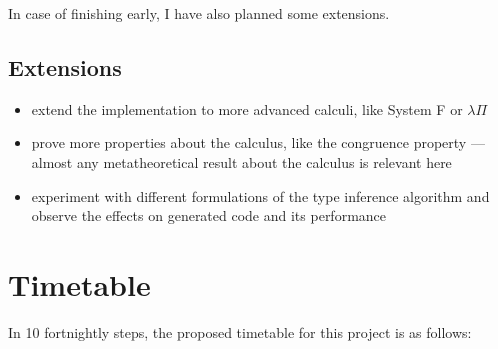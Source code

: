 \documentclass[12pt]{article}
\begin{document}
In case of finishing early, I have also planned some extensions.
\subsection*{Extensions}
\begin{itemize}
\item
extend the implementation to more advanced calculi, like System F or \(\lambda\Pi\)
\item
prove more properties about the calculus, like the congruence property --- almost any metatheoretical result about the calculus is relevant here
\item
experiment with different formulations of the type inference algorithm and observe the effects on generated code and its performance
\end{itemize}
\section*{Timetable}
In 10 fortnightly steps, the proposed timetable for this project is as follows:
\end{document}
